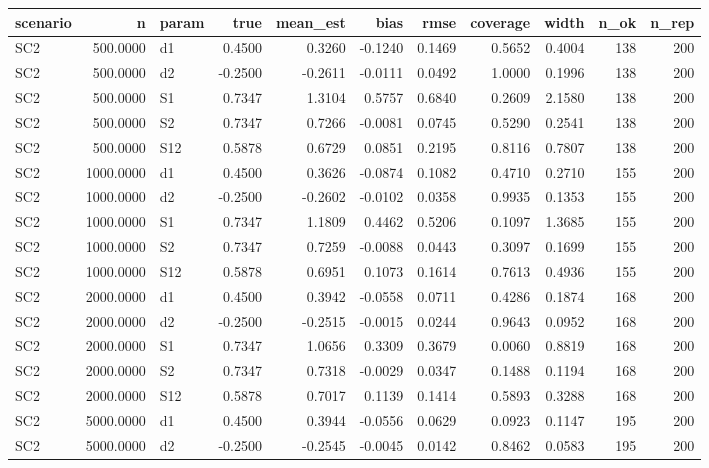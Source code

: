 \begin{tabular}{lrlrrrrrrrr}
  \hline
scenario & n & param & true & mean\_est & bias & rmse & coverage & width & n\_ok & n\_rep \\ 
  \hline
SC2 & 500.0000 & d1 & 0.4500 & 0.3260 & -0.1240 & 0.1469 & 0.5652 & 0.4004 &   138 &   200 \\ 
  SC2 & 500.0000 & d2 & -0.2500 & -0.2611 & -0.0111 & 0.0492 & 1.0000 & 0.1996 &   138 &   200 \\ 
  SC2 & 500.0000 & S1 & 0.7347 & 1.3104 & 0.5757 & 0.6840 & 0.2609 & 2.1580 &   138 &   200 \\ 
  SC2 & 500.0000 & S2 & 0.7347 & 0.7266 & -0.0081 & 0.0745 & 0.5290 & 0.2541 &   138 &   200 \\ 
  SC2 & 500.0000 & S12 & 0.5878 & 0.6729 & 0.0851 & 0.2195 & 0.8116 & 0.7807 &   138 &   200 \\ 
  SC2 & 1000.0000 & d1 & 0.4500 & 0.3626 & -0.0874 & 0.1082 & 0.4710 & 0.2710 &   155 &   200 \\ 
  SC2 & 1000.0000 & d2 & -0.2500 & -0.2602 & -0.0102 & 0.0358 & 0.9935 & 0.1353 &   155 &   200 \\ 
  SC2 & 1000.0000 & S1 & 0.7347 & 1.1809 & 0.4462 & 0.5206 & 0.1097 & 1.3685 &   155 &   200 \\ 
  SC2 & 1000.0000 & S2 & 0.7347 & 0.7259 & -0.0088 & 0.0443 & 0.3097 & 0.1699 &   155 &   200 \\ 
  SC2 & 1000.0000 & S12 & 0.5878 & 0.6951 & 0.1073 & 0.1614 & 0.7613 & 0.4936 &   155 &   200 \\ 
  SC2 & 2000.0000 & d1 & 0.4500 & 0.3942 & -0.0558 & 0.0711 & 0.4286 & 0.1874 &   168 &   200 \\ 
  SC2 & 2000.0000 & d2 & -0.2500 & -0.2515 & -0.0015 & 0.0244 & 0.9643 & 0.0952 &   168 &   200 \\ 
  SC2 & 2000.0000 & S1 & 0.7347 & 1.0656 & 0.3309 & 0.3679 & 0.0060 & 0.8819 &   168 &   200 \\ 
  SC2 & 2000.0000 & S2 & 0.7347 & 0.7318 & -0.0029 & 0.0347 & 0.1488 & 0.1194 &   168 &   200 \\ 
  SC2 & 2000.0000 & S12 & 0.5878 & 0.7017 & 0.1139 & 0.1414 & 0.5893 & 0.3288 &   168 &   200 \\ 
  SC2 & 5000.0000 & d1 & 0.4500 & 0.3944 & -0.0556 & 0.0629 & 0.0923 & 0.1147 &   195 &   200 \\ 
  SC2 & 5000.0000 & d2 & -0.2500 & -0.2545 & -0.0045 & 0.0142 & 0.8462 & 0.0583 &   195 &   200 \\ 

\end{tabular}
